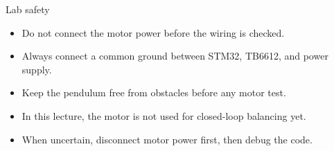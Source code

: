 \documentclass[aspectratio=169]{beamer}
\begin{document}
\begin{frame}{Lab safety}
\begin{itemize}
    \item Do not connect the motor power before the wiring is checked.
    \vspace{0.25cm}
    \item Always connect a common ground between STM32, TB6612, and power supply.
    \vspace{0.25cm}
    \item Keep the pendulum free from obstacles before any motor test.
    \vspace{0.25cm}
    \item In this lecture, the motor is not used for closed-loop balancing yet.
    \vspace{0.25cm}
    \item When uncertain, disconnect motor power first, then debug the code.
\end{itemize}
\end{frame}
\end{document}
